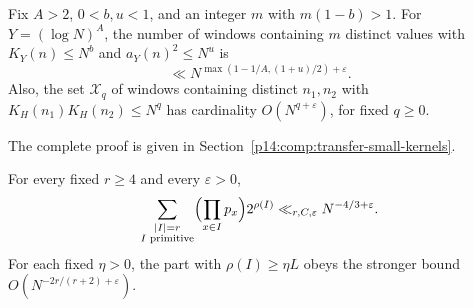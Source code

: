 \begin{lemma}
\label{p13:transfer:small-kernels}
Fix $A>2$, $0<b,u<1$, and an integer $m$ with $m(1-b)>1$.
For $Y=(\log N)^A$, the number of windows containing $m$ distinct
values with $K_Y(n)\leq N^b$ and $a_Y(n)^2\leq N^u$ is
\begin{equation}
 \ll N^{\max(1-1/A,(1+u)/2)+\varepsilon}.
 \label{p13:transfer:small-kernels-bound}
\end{equation}
Also, the set $\mathcal X_q$ of windows containing distinct $n_1,n_2$
with $K_H(n_1)K_H(n_2)\leq N^q$ has cardinality
$O(N^{q+\varepsilon})$, for fixed $q\geq0$.
\end{lemma}

\noindent The complete proof is given in Section~\ref{p14:comp:transfer-small-kernels}.


\begin{proposition}
\label{p13:transfer:primitive}
For every fixed $r\geq4$ and every $\varepsilon>0$,
\begin{equation}
 \sum_{\substack{|I|=r\\I\text{ primitive}}}
         \Bigl(\prod_{x\in I}p_x\Bigr)2^{\rho(I)}
       \ll_{r,C,\varepsilon}N^{-4/3+\varepsilon}.
 \label{p13:transfer:primitive-bound}
\end{equation}
For each fixed $\eta>0$, the part with $\rho(I)\geq\eta L$ obeys
the stronger bound $O(N^{-2r/(r+2)+\varepsilon})$.
\end{proposition}

